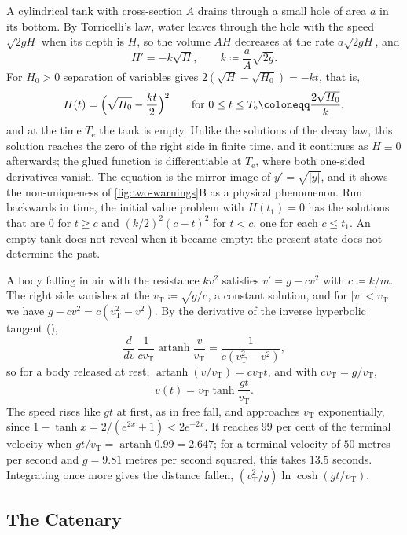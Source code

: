 A cylindrical tank with cross-section $A$ drains through a small hole of area $a$ in its bottom. By Torricelli's law, water leaves through the hole with the speed $\sqrt{2gH}$ when its depth is $H$, so the volume $AH$ decreases at the rate $a\sqrt{2gH}$, and
\[
H'=-k\sqrt H,\qquad k\coloneqq\frac aA\sqrt{2g} .
\]
For $H_0>0$ separation of variables gives $2(\sqrt H-\sqrt{H_0})=-kt$, that is,
\[
H(t)=\Bigl(\sqrt{H_0}-\frac{kt}2\Bigr)^2\qquad\text{for }0\le t\le T_{\mathrm e}\coloneqq\frac{2\sqrt{H_0}}k ,
\]
and at the time $T_{\mathrm e}$ the tank is empty. Unlike the solutions of the decay law, this solution reaches the zero of the right side in finite time, and it continues as $H\equiv0$ afterwards; the glued function is differentiable at $T_{\mathrm e}$, where both one-sided derivatives vanish. The equation is the mirror image of $y'=\sqrt{|y|}$, and it shows the non-uniqueness of \cref{fig:two-warnings}B as a physical phenomenon. Run backwards in time, the initial value problem with $H(t_1)=0$ has the solutions that are $0$ for $t\ge c$ and $(k/2)^2(c-t)^2$ for $t<c$, one for each $c\le t_1$. An empty tank does not reveal when it became empty: the present state does not determine the past.

A body falling in air with the resistance $kv^2$ satisfies $v'=g-cv^2$ with $c\coloneqq k/m$. The right side vanishes at the  $v_{\mathrm T}\coloneqq\sqrt{g/c}$, a constant solution, and for $|v|<v_{\mathrm T}$ we have $g-cv^2=c(v_{\mathrm T}^2-v^2)$. By the derivative of the inverse hyperbolic tangent (),
\[
\frac d{dv}\,\frac1{cv_{\mathrm T}}\operatorname{artanh}\frac v{v_{\mathrm T}}=\frac1{c(v_{\mathrm T}^2-v^2)} ,
\]
so for a body released at rest, $\operatorname{artanh}(v/v_{\mathrm T})=cv_{\mathrm T}t$, and with $cv_{\mathrm T}=g/v_{\mathrm T}$,
\[
v(t)=v_{\mathrm T}\tanh\frac{gt}{v_{\mathrm T}} .
\]
The speed rises like $gt$ at first, as in free fall, and approaches $v_{\mathrm T}$ exponentially, since $1-\tanh x=2/(e^{2x}+1)<2e^{-2x}$. It reaches $99$ per cent of the terminal velocity when $gt/v_{\mathrm T}=\operatorname{artanh}0.99=2.647$; for a terminal velocity of $50$ metres per second and $g=9.81$ metres per second squared, this takes $13.5$ seconds. Integrating once more gives the distance fallen, $(v_{\mathrm T}^2/g)\ln\cosh(gt/v_{\mathrm T})$.

\subsection{The Catenary}
\label{subsec:catenary}

